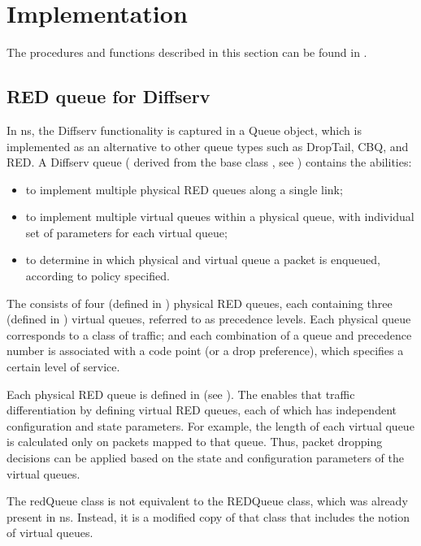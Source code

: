 \section{Implementation}
\label{sec:diffservimplement}
The procedures and functions described in this section can be found in
.

\subsection{RED queue for Diffserv}
\label{sec:dsredq}

In ns, the Diffserv functionality is captured in a Queue object, which is 
implemented as an alternative to other queue types such as DropTail, CBQ, and 
RED.  A Diffserv queue ( derived from the base class 
, see ) contains the abilities:
\begin{itemize}
\item
to implement multiple physical RED queues along a single link;
\item
to implement multiple virtual queues within a physical queue, with 
individual set of parameters for each virtual queue;
\item
to determine in which physical and virtual queue a packet is enqueued, according
to policy specified.
\end{itemize}

The  consists of four (defined in ) physical 
RED queues,
each containing three (defined in ) virtual queues, 
referred to as precedence levels. Each physical queue corresponds to a class of
traffic; and each combination of a queue and precedence number is associated 
with a code point (or a drop preference), which specifies a certain level of 
service.

Each physical RED queue is defined in  
(see ). 
The  enables that traffic differentiation by defining 
virtual RED queues, each of which has independent configuration and state 
parameters. 
For example, the length of each virtual queue is calculated only on packets 
mapped to that queue.  Thus, packet dropping decisions can be applied based on 
the state and configuration parameters of the virtual queues.

The redQueue class is not equivalent to the REDQueue class, which was already 
present in ns.  Instead, it is a modified copy of that class that includes the 
notion of virtual queues.

